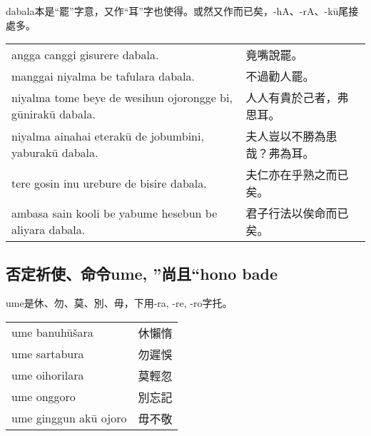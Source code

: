 \documentclass{article}
\begin{document}
\noindent dabala本是``罷''字意，又作``耳''字也使得。或然又作而已矣，-hA、-rA、-k\={u}尾接處多。
\begin{center}
    \begin{tabularx}{\textwidth}{XX}
     angga canggi gisurere dabala. &竟嘴說罷。\\
     manggai niyalma be tafulara dabala. &不過勸人罷。\\
     niyalma tome beye de wesihun ojorongge bi, g\={u}nirak\={u} dabala. &人人有貴於己者，弗思耳。\\
     niyalma ainahai eterak\={u} de jobumbini, yaburak\={u} dabala. &夫人豈以不勝為患哉？弗為耳。\\
     tere gosin inu urebure de bisire dabala. &夫仁亦在乎熟之而已矣。\\
     ambasa sain kooli be yabume hesebun be aliyara dabala. &君子行法以俟命而已矣。
    \end{tabularx}
\end{center}

\subsection{否定祈使、命令ume, ”尚且“hono bade}
\noindent ume是休、勿、莫、別、毋，下用-ra, -re, -ro字托。
\begin{center}
    \begin{tabularx}{\textwidth}{XX}
     ume banuh\={u}\v{s}ara &休懶惰\\
     ume sartabura &勿遲悞\\
     ume oihorilara &莫輕忽\\
     ume onggoro &別忘記\\ume ginggun ak\={u} ojoro &毋不敬
    \end{tabularx}
\end{center}
\end{document}
